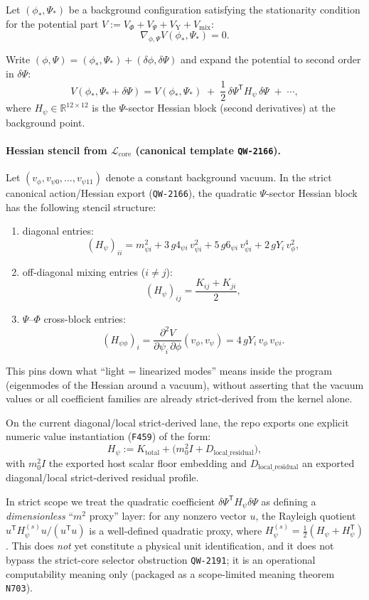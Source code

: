\documentclass[11pt,a4paper]{article}
\begin{document}
Let $(\phi_\ast,\Psi_\ast)$ be a background configuration satisfying the stationarity condition for the potential part
$V:=V_{\Phi}+V_{\Psi}+V_{\mathrm{Y}}+V_{\mathrm{mix}}$:
\[
\nabla_{\phi,\Psi} V(\phi_\ast,\Psi_\ast)=0.
\]

Write $(\phi,\Psi)=(\phi_\ast,\Psi_\ast)+(\delta\phi,\delta\Psi)$ and expand the potential to second order in $\delta\Psi$:
\[
V(\phi_\ast,\Psi_\ast+\delta\Psi)
=
V(\phi_\ast,\Psi_\ast)
\;+\;\frac12\,\delta\Psi^{\mathsf T} H_{\psi}\,\delta\Psi
\;+\;\cdots,
\]
where $H_{\psi}\in\mathbb{R}^{12\times 12}$ is the $\Psi$-sector Hessian block (second derivatives) at the background point.

\paragraph{Hessian stencil from $\mathcal{L}_{\mathrm{core}}$ (canonical template \texttt{QW-2166}).}
Let $(v_{\phi},v_{\psi 0},\dots,v_{\psi 11})$ denote a constant background vacuum.
In the strict canonical action/Hessian export (\texttt{QW-2166}), the quadratic $\Psi$-sector Hessian block has the following stencil structure:
\begin{enumerate}[label=\arabic*.]
  \item diagonal entries:
  \[
  (H_{\psi})_{ii}
  =
  m_{\psi i}^2
  +3\,g4_{\psi i}\,v_{\psi i}^2
  +5\,g6_{\psi i}\,v_{\psi i}^4
  +2\,gY_i\,v_{\phi}^2,
  \]
  \item off-diagonal mixing entries ($i\neq j$):
  \[
  (H_{\psi})_{ij}
  =
  \frac{K_{ij}+K_{ji}}{2},
  \]
  \item $\Psi$--$\Phi$ cross-block entries:
  \[
  (H_{\psi\phi})_{i}
  =
  \frac{\partial^2 V}{\partial \psi_i\,\partial \phi}(v_{\phi},v_{\psi})
  =
  4\,gY_i\,v_{\phi}\,v_{\psi i}.
  \]
\end{enumerate}
This pins down what “light = linearized modes” means inside the program (eigenmodes of the Hessian around a vacuum),
without asserting that the vacuum values or all coefficient families are already strict-derived from the kernel alone.

On the current diagonal/local strict-derived lane, the repo exports one explicit numeric value instantiation (\texttt{F459}) of the form:
\[
H_{\psi}
:=
K_{\mathrm{total}} + \bigl(m_0^2 I + D_{\mathrm{local\_residual}}\bigr),
\]
with $m_0^2 I$ the exported host scalar floor embedding and $D_{\mathrm{local\_residual}}$ an exported diagonal/local strict-derived residual profile.

In strict scope we treat the quadratic coefficient $\delta\Psi^{\mathsf T}H_{\psi}\delta\Psi$ as defining a \emph{dimensionless} “$m^2$ proxy” layer:
for any nonzero vector $u$, the Rayleigh quotient
$u^{\mathsf T}H_{\psi}^{(s)}u/(u^{\mathsf T}u)$ is a well-defined quadratic proxy, where $H_{\psi}^{(s)}=\tfrac12(H_{\psi}+H_{\psi}^{\mathsf T})$.
This does \emph{not} yet constitute a physical unit identification, and it does not bypass the strict-core selector obstruction \texttt{QW-2191};
it is an operational computability meaning only (packaged as a scope-limited meaning theorem \texttt{N703}).
\end{document}
